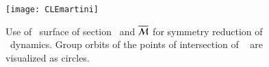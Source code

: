 \begin{figure}[ht]
\begin{center}
  \texttt{[image: CLEmartini]}
\end{center}
\caption{
Use of \Poincare\ surface of section \PoincS\ and
{\slice} $\overline{\cal M}$ for symmetry reduction of \cLe\
dynamics. Group orbits of the points of intersection of \rpo\
 are visualized as circles.
    }
\label{fig:CLEmartini}
\end{figure}
